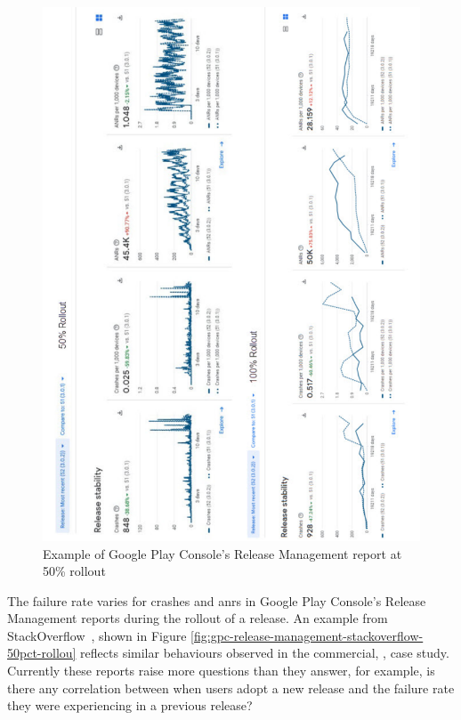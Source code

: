 \begin{figure}
    \centering
    \includegraphics{images/android-vitals-screenshots/stackoverflow/MSZVo-trimmed.pdf}
    \caption{Example of Google Play Console's Release Management report at 50\% rollout}
    \label{fig:gpc-release-management-stackoverflow-50pct-rollout}
\end{figure}

The failure rate varies for crashes and \Glspl{anr} in Google Play Console's Release Management reports during the rollout of a release. An example from StackOverflow~, shown in Figure \ref{fig:gpc-release-management-stackoverflow-50pct-rollou} reflects similar behaviours observed in the commercial, , case study. Currently these reports raise more questions than they answer, for example, is there any correlation between when users adopt a new release and the failure rate they were experiencing in a previous release?  

